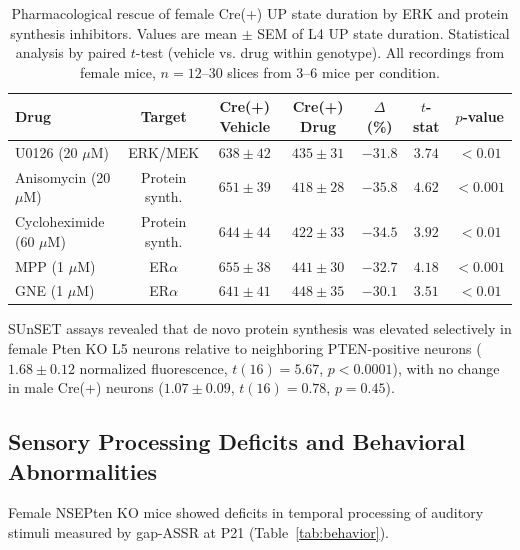 \documentclass[11pt]{article}
\begin{document}
\begin{table}[H]
\centering
\caption{Pharmacological rescue of female Cre(+) UP state duration by ERK and protein synthesis inhibitors. Values are mean $\pm$ SEM of L4 UP state duration. Statistical analysis by paired $t$-test (vehicle vs. drug within genotype). All recordings from female mice, $n = 12$--30 slices from 3--6 mice per condition.}
\label{tab:pathway}
\begin{tabular}{lcccccc}
\toprule
\textbf{Drug} & \textbf{Target} & \textbf{Cre(+) Vehicle} & \textbf{Cre(+) Drug} & \textbf{$\Delta$ (\%)} & \textbf{$t$-stat} & \textbf{$p$-value} \\
\midrule
U0126 (20 $\mu$M) & ERK/MEK & $638 \pm 42$ & $435 \pm 31$ & $-31.8$ & $3.74$ & $< 0.01$ \\
Anisomycin (20 $\mu$M) & Protein synth. & $651 \pm 39$ & $418 \pm 28$ & $-35.8$ & $4.62$ & $< 0.001$ \\
Cycloheximide (60 $\mu$M) & Protein synth. & $644 \pm 44$ & $422 \pm 33$ & $-34.5$ & $3.92$ & $< 0.01$ \\
MPP (1 $\mu$M) & ER$\alpha$ & $655 \pm 38$ & $441 \pm 30$ & $-32.7$ & $4.18$ & $< 0.001$ \\
GNE (1 $\mu$M) & ER$\alpha$ & $641 \pm 41$ & $448 \pm 35$ & $-30.1$ & $3.51$ & $< 0.01$ \\
\bottomrule
\end{tabular}
\end{table}

SUnSET assays revealed that de novo protein synthesis was elevated selectively in female Pten KO L5 neurons relative to neighboring PTEN-positive neurons ($1.68 \pm 0.12$ normalized fluorescence, $t(16) = 5.67$, $p < 0.0001$), with no change in male Cre(+) neurons ($1.07 \pm 0.09$, $t(16) = 0.78$, $p = 0.45$).

\subsection{Sensory Processing Deficits and Behavioral Abnormalities}

Female NSEPten KO mice showed deficits in temporal processing of auditory stimuli measured by gap-ASSR at P21 (Table~\ref{tab:behavior}).
\end{document}
